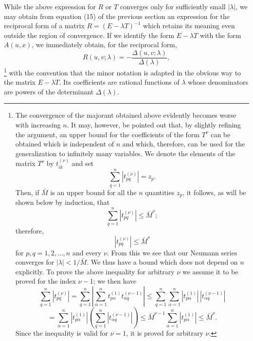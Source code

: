 While the above expression for $R$ or $T$ converges only for sufficiently small $|\lambda|$, we may obtain from equation (15) of the previous section an expression for the reciprocal form of a matrix $R=(E-\lambda T)^{-1}$ which retains its meaning even outside the region of convergence. If we identify the form $E-\lambda T$ with the form $A(u,x)$, we immediately obtain, for the reciprocal form,
\[
 R(u,v;\lambda)=-\frac{\Delta(u,v;\lambda)}{\Delta(\lambda)},
\]
\footnote{The convergence of the majorant obtained above evidently becomes worse with increasing $n$. It may, however, be pointed out that, by slightly refining the argument, an upper bound for the coefficients of the form $T^\nu$ can be obtained which is independent of $n$ and which, therefore, can be used for the generalization to infinitely many variables. We denote the elements of the matrix $T^\nu$ by $t_{ik}^{(\nu)}$ and set
\[
\sum_{q=1}^{n}|t_{pq}^{(\nu)}|=z_p.
\]
Then, if $\bar M$ is an upper bound for all the $n$ quantities $z_p$, it follows, as will be shown below by induction, that
\[
\sum_{q=1}^{n}|t_{pq}^{(\nu)}|\le \bar M^\nu;
\]
therefore,
\[
|t_{pq}^{(\nu)}|\le \bar M^\nu
\]
for $p,q=1,2,\ldots,n$ and every $\nu$. From this we see that our Neumann series converges for $|\lambda|<1/\bar M$. We thus have a bound which does not depend on $n$ explicitly. To prove the above inequality for arbitrary $\nu$ we assume it to be proved for the index $\nu-1$; we then have
\[
\sum_{q=1}^{n}|t_{pq}^{(\nu)}|
=\sum_{q=1}^{n}\left|\sum_{\alpha=1}^{n}t_{p\alpha}^{(1)}t_{\alpha q}^{(\nu-1)}\right|
\le \sum_{q=1}^{n}\sum_{\alpha=1}^{n}|t_{p\alpha}^{(1)}|\,|t_{\alpha q}^{(\nu-1)}|
\]
\[
=\sum_{\alpha=1}^{n}|t_{p\alpha}^{(1)}|
\left(\sum_{q=1}^{n}|t_{\alpha q}^{(\nu-1)}|\right)
\le \bar M^{\nu-1}\sum_{\alpha=1}^{n}|t_{p\alpha}^{(1)}|
\le \bar M^\nu.
\]
Since the inequality is valid for $\nu=1$, it is proved for arbitrary $\nu$.}
with the convention that the minor notation is adapted in the obvious way to the matrix $E-\lambda T$. Its coefficients are rational functions of $\lambda$ whose denominators are powers of the determinant $\Delta(\lambda)$.


